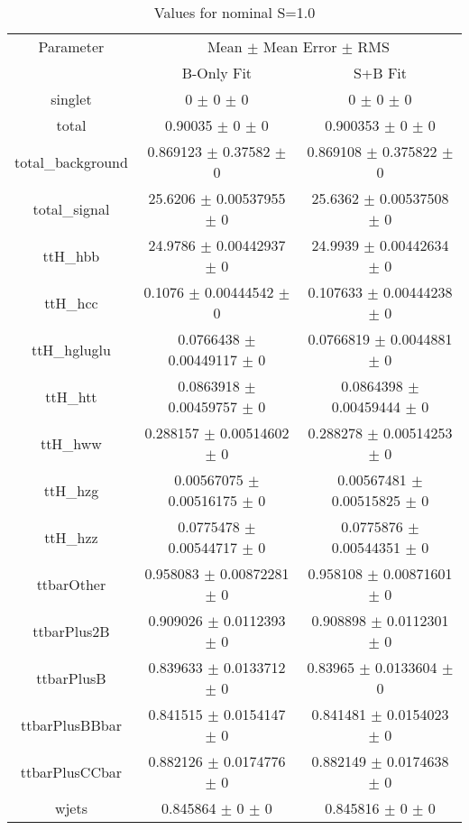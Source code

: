 \begin{table}
\centering
\caption{Values for nominal S=1.0}
\begin{tabular}{ccc}
\toprule
Parameter & \multicolumn{2}{c}{Mean $\pm$ Mean Error $\pm$ RMS}\\
 & B-Only Fit & S+B Fit\\
\midrule
singlet & \num{0} $\pm$ \num{0} $\pm$ \num{0} & \num{0} $\pm$ \num{0} $\pm$ \num{0}\\
total & \num{0.90035} $\pm$ \num{0} $\pm$ \num{0} & \num{0.900353} $\pm$ \num{0} $\pm$ \num{0}\\
total\_background & \num{0.869123} $\pm$ \num{0.37582} $\pm$ \num{0} & \num{0.869108} $\pm$ \num{0.375822} $\pm$ \num{0}\\
total\_signal & \num{25.6206} $\pm$ \num{0.00537955} $\pm$ \num{0} & \num{25.6362} $\pm$ \num{0.00537508} $\pm$ \num{0}\\
ttH\_hbb & \num{24.9786} $\pm$ \num{0.00442937} $\pm$ \num{0} & \num{24.9939} $\pm$ \num{0.00442634} $\pm$ \num{0}\\
ttH\_hcc & \num{0.1076} $\pm$ \num{0.00444542} $\pm$ \num{0} & \num{0.107633} $\pm$ \num{0.00444238} $\pm$ \num{0}\\
ttH\_hgluglu & \num{0.0766438} $\pm$ \num{0.00449117} $\pm$ \num{0} & \num{0.0766819} $\pm$ \num{0.0044881} $\pm$ \num{0}\\
ttH\_htt & \num{0.0863918} $\pm$ \num{0.00459757} $\pm$ \num{0} & \num{0.0864398} $\pm$ \num{0.00459444} $\pm$ \num{0}\\
ttH\_hww & \num{0.288157} $\pm$ \num{0.00514602} $\pm$ \num{0} & \num{0.288278} $\pm$ \num{0.00514253} $\pm$ \num{0}\\
ttH\_hzg & \num{0.00567075} $\pm$ \num{0.00516175} $\pm$ \num{0} & \num{0.00567481} $\pm$ \num{0.00515825} $\pm$ \num{0}\\
ttH\_hzz & \num{0.0775478} $\pm$ \num{0.00544717} $\pm$ \num{0} & \num{0.0775876} $\pm$ \num{0.00544351} $\pm$ \num{0}\\
ttbarOther & \num{0.958083} $\pm$ \num{0.00872281} $\pm$ \num{0} & \num{0.958108} $\pm$ \num{0.00871601} $\pm$ \num{0}\\
ttbarPlus2B & \num{0.909026} $\pm$ \num{0.0112393} $\pm$ \num{0} & \num{0.908898} $\pm$ \num{0.0112301} $\pm$ \num{0}\\
ttbarPlusB & \num{0.839633} $\pm$ \num{0.0133712} $\pm$ \num{0} & \num{0.83965} $\pm$ \num{0.0133604} $\pm$ \num{0}\\
ttbarPlusBBbar & \num{0.841515} $\pm$ \num{0.0154147} $\pm$ \num{0} & \num{0.841481} $\pm$ \num{0.0154023} $\pm$ \num{0}\\
ttbarPlusCCbar & \num{0.882126} $\pm$ \num{0.0174776} $\pm$ \num{0} & \num{0.882149} $\pm$ \num{0.0174638} $\pm$ \num{0}\\
wjets & \num{0.845864} $\pm$ \num{0} $\pm$ \num{0} & \num{0.845816} $\pm$ \num{0} $\pm$ \num{0}\\
\bottomrule
\end{tabular}
\end{table}